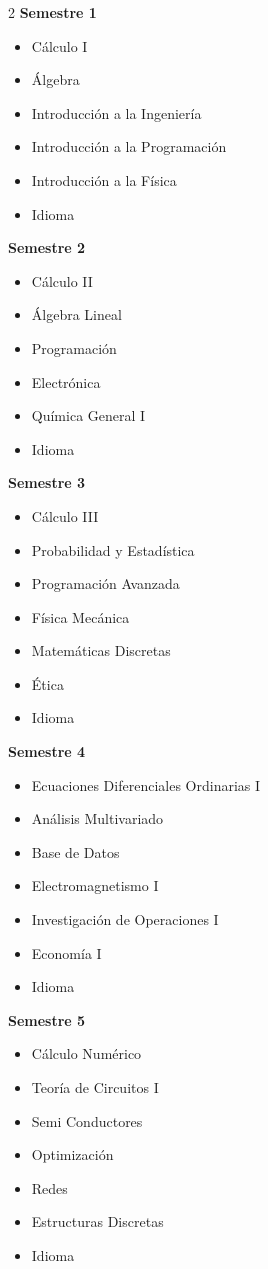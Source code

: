 \documentclass[12pt,a4paper]{article}
\begin{document}
	\begin{multicols}{2}
		\textbf{Semestre 1}
		\begin{itemize}
			\item Cálculo I
			\item Álgebra
			\item Introducción a la Ingeniería
			\item Introducción a la Programación
			\item Introducción a la Física
			\item Idioma
		\end{itemize}
		
		\textbf{Semestre 2}
		\begin{itemize}
			\item Cálculo II
			\item Álgebra Lineal
			\item Programación
			\item Electrónica
			\item Química General I
			\item Idioma
		\end{itemize}
		
		\textbf{Semestre 3}
		\begin{itemize}
			\item Cálculo III
			\item Probabilidad y Estadística
			\item Programación Avanzada
			\item Física Mecánica
			\item Matemáticas Discretas
			\item Ética
			\item Idioma
		\end{itemize}
		
		\textbf{Semestre 4}
		\begin{itemize}
			\item Ecuaciones Diferenciales Ordinarias I
			\item Análisis Multivariado
			\item Base de Datos
			\item Electromagnetismo I
			\item Investigación de Operaciones I
			\item Economía I
			\item Idioma
		\end{itemize}
		
		\textbf{Semestre 5}
		\begin{itemize}
			\item Cálculo Numérico
			\item Teoría de Circuitos I
			\item Semi Conductores
			\item Optimización
			\item Redes
			\item Estructuras Discretas
			\item Idioma
		\end{itemize}
		

\end{multicols}
\end{document}

